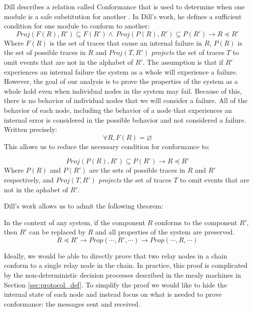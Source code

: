 \documentclass[runningheads]{llncs}
\newcommand{\projalpha}[2]{\mathit{Proj}(#1, #2)}
\newcommand{\secref}[1]{Section \ref{#1}}
\begin{document}
Dill describes a relation called Conformance that is used to determine when one module is a safe substitution for another \cite{dill_trace_theory}.
In Dill's work, he defines a sufficient condition for one module to conform to another:
$$\projalpha{F(R)}{R'} \subseteq F(R') \wedge\ \projalpha{P(R)}{R'} \subseteq P(R') \longrightarrow R \preceq R'$$
Where $F(R)$ is the set of traces that cause an internal failure in $R$, $P(R)$ is the set of possible traces in $R$ and $\projalpha{T}{R'}$ \emph{projects} the set of traces $T$ to omit events that are not in the alphabet of $R'$.
The assumption is that if $R'$ experiences an internal failure the system as a whole will experience a failure. However, the goal of our analysis is to prove the properties of the system as a whole hold even when individual nodes in the system may fail. Because of this, there is no behavior of individual nodes that we will consider a failure. All of the behavior of each node, including the behavior of a node that experiences an internal error is considered in the possible behavior and not considered a failure. Written precisely:
$$
\forall R, F(R) = \varnothing
$$
This allows us to reduce the necessary condition for conformance to:

\begin{definition}[Conformance]
\label{def:conformance}
$$\projalpha{P(R)}{R'} \subseteq P(R') \longrightarrow R \preceq R'$$
Where $P(R)$ and $P(R')$ are the sets of possible traces in $R$ and $R'$ respectively, and $\projalpha{T}{R'}$ \emph{projects} the set of traces $T$ to omit events that are not in the aphabet of $R'$.
\end{definition}

Dill's work allows us to admit the following theorem: 
\begin{theorem}
\label{theorem:dill}
 In the context of any system, if the component $R$ conforms to the component $R'$, then $R'$ can be replaced by $R$ and all properties of the system are preserved.
$$R \preceq R' \longrightarrow Prop(\dotsm, R', \dotsm) \longrightarrow Prop(\dotsm, R, \dotsm)
$$
\end{theorem}

Ideally, we would be able to directly prove that two relay nodes in a chain conform to a single relay node in the chain. In practice, this proof is complicated by the non-deterministic decision processes described in the mealy machines in \secref{sec:protocol_def}. To simplify the proof we would like to hide the internal state of each node and instead focus on what is needed to prove conformance: the messages sent and received.
\end{document}
